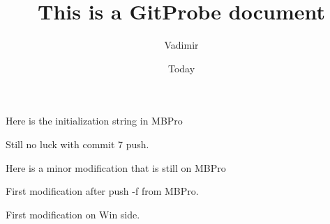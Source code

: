 \documentclass[]{article}
\begin{document}
\title{This is a GitProbe document}
\author{Vadimir}
\date{Today}
\maketitle

Here is the initialization string in MBPro

Still no luck with commit 7 push.

Here is a minor modification that is still on MBPro

First modification after push -f  from MBPro.

First modification on Win side. 
\end{document}
